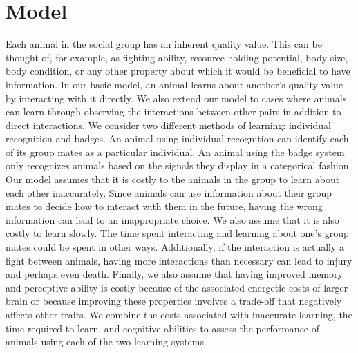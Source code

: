 \section*{Model} 
Each animal in the social group has an inherent quality value. This can be thought of, for example, as fighting ability, resource holding potential, body size, body condition, or any other property about which it would be beneficial to have information. In our basic model, an animal learns about another's quality value by interacting with it directly. We also extend our model to cases where animals can learn through observing the interactions between other pairs in addition to direct interactions. We consider two different methods of learning: individual recognition and badges. An animal using individual recognition can identify each of its group mates as a particular individual. An animal using the badge system only recognizes animals based on the signals they display in a categorical fashion. Our model assumes that it is costly to the animals in the group to learn about each other inaccurately. Since animals can use information about their group mates to decide how to interact with them in the future, having the wrong information can lead to an inappropriate choice. We also assume that it is also costly to learn slowly. The time spent interacting and learning about one's group mates could be spent in other ways. Additionally, if the interaction is actually a fight between animals, having more interactions than necessary can lead to injury and perhaps even death. Finally, we also assume that having improved memory and perceptive ability is costly because of the associated energetic costs of larger brain or because improving these properties involves a trade-off that negatively affects other traits. We combine the costs associated with inaccurate learning, the time required to learn, and cognitive abilities to assess the performance of animals using each of the two learning systems. 

